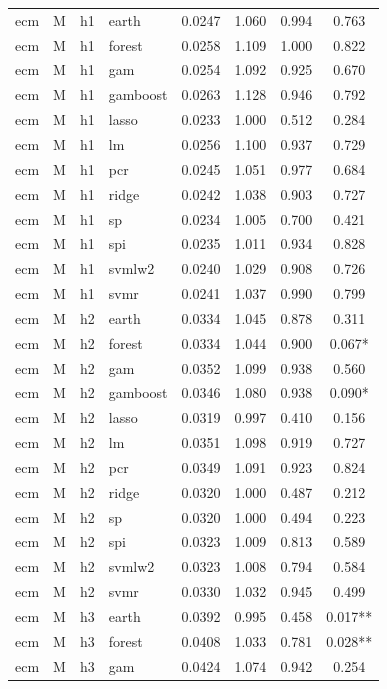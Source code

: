 \begin{ThreePartTable}
\begin{longtable}[t]{llclcccc}
\addlinespace
ecm & M & h1 & earth & 0.0247 & 1.060 & 0.994 & 0.763\\
ecm & M & h1 & forest & 0.0258 & 1.109 & 1.000 & 0.822\\
ecm & M & h1 & gam & 0.0254 & 1.092 & 0.925 & 0.670\\
ecm & M & h1 & gamboost & 0.0263 & 1.128 & 0.946 & 0.792\\
ecm & M & h1 & lasso & 0.0233 & 1.000 & 0.512 & 0.284\\
ecm & M & h1 & lm & 0.0256 & 1.100 & 0.937 & 0.729\\
ecm & M & h1 & pcr & 0.0245 & 1.051 & 0.977 & 0.684\\
ecm & M & h1 & ridge & 0.0242 & 1.038 & 0.903 & 0.727\\
ecm & M & h1 & sp & 0.0234 & 1.005 & 0.700 & 0.421\\
ecm & M & h1 & spi & 0.0235 & 1.011 & 0.934 & 0.828\\
ecm & M & h1 & svmlw2 & 0.0240 & 1.029 & 0.908 & 0.726\\
ecm & M & h1 & svmr & 0.0241 & 1.037 & 0.990 & 0.799\\
\addlinespace
ecm & M & h2 & earth & 0.0334 & 1.045 & 0.878 & 0.311\\
ecm & M & h2 & forest & 0.0334 & 1.044 & 0.900 & 0.067*\\
ecm & M & h2 & gam & 0.0352 & 1.099 & 0.938 & 0.560\\
ecm & M & h2 & gamboost & 0.0346 & 1.080 & 0.938 & 0.090*\\
ecm & M & h2 & lasso & 0.0319 & 0.997 & 0.410 & 0.156\\
ecm & M & h2 & lm & 0.0351 & 1.098 & 0.919 & 0.727\\
ecm & M & h2 & pcr & 0.0349 & 1.091 & 0.923 & 0.824\\
ecm & M & h2 & ridge & 0.0320 & 1.000 & 0.487 & 0.212\\
ecm & M & h2 & sp & 0.0320 & 1.000 & 0.494 & 0.223\\
ecm & M & h2 & spi & 0.0323 & 1.009 & 0.813 & 0.589\\
ecm & M & h2 & svmlw2 & 0.0323 & 1.008 & 0.794 & 0.584\\
ecm & M & h2 & svmr & 0.0330 & 1.032 & 0.945 & 0.499\\
\addlinespace
ecm & M & h3 & earth & 0.0392 & 0.995 & 0.458 & 0.017**\\
ecm & M & h3 & forest & 0.0408 & 1.033 & 0.781 & 0.028**\\
ecm & M & h3 & gam & 0.0424 & 1.074 & 0.942 & 0.254\\

\end{longtable}
\end{ThreePartTable}
